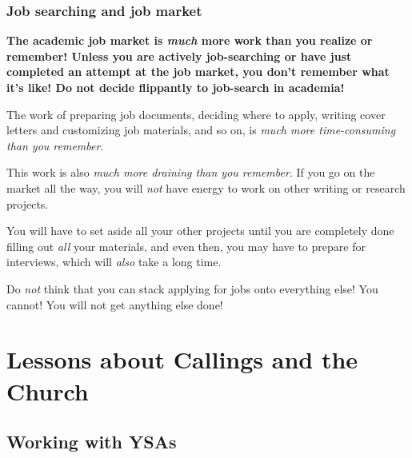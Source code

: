 		\subsubsection{Job searching and job market}
		
			\begin{compactitem}
			
				\item \textbf{The academic job market is \textit{much} more work than you realize or remember! Unless you are actively job-searching or have just completed an attempt at the job market, you don't remember what it's like! Do not decide flippantly to job-search in academia!}
					\begin{compactitem}
						\item The work of preparing job documents, deciding where to apply, writing cover letters and customizing job materials, and so on, is \textit{much more time-consuming than you remember}.
						\item This work is also \textit{much more draining than you remember}. If you go on the market all the way, you will \textit{not} have energy to work on other writing or research projects.
						\item You will have to set aside all your other projects until you are completely done filling out \textit{all} your materials, and even then, you may have to prepare for interviews, which will \textit{also} take a long time.
						\item Do \textit{not} think that you can stack applying for jobs onto everything else! You cannot! You will not get anything else done!
					\end{compactitem}
			
			\end{compactitem}

\section{Lessons about Callings and the Church}
	\label{LESSONS-CHURCH}
	
	\subsection{Working with YSAs}
	

